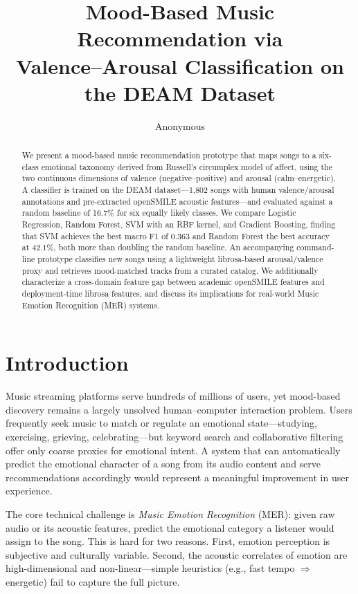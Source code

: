 \documentclass{article}
\title{Mood-Based Music Recommendation via\\
Valence--Arousal Classification on the DEAM Dataset}
\author{Anonymous}
\begin{document}
\lhead{}

\maketitle

%
\begin{abstract}
%
We present a mood-based music recommendation prototype that maps songs to a
six-class emotional taxonomy derived from Russell's circumplex model of affect,
using the two continuous dimensions of valence (negative--positive) and arousal
(calm--energetic).
A classifier is trained on the DEAM dataset---1{,}802 songs with human
valence/arousal annotations and pre-extracted openSMILE acoustic
features---and evaluated against a random baseline of 16.7\% for six equally
likely classes.
We compare Logistic Regression, Random Forest, SVM with an RBF kernel, and
Gradient Boosting, finding that SVM achieves the best macro F1 of 0.363
and Random Forest the best accuracy at 42.1\%, both more than doubling the
random baseline.
An accompanying command-line prototype classifies new songs using a
lightweight librosa-based arousal/valence proxy and retrieves mood-matched
tracks from a curated catalog.
We additionally characterize a cross-domain feature gap between academic
openSMILE features and deployment-time librosa features, and discuss its
implications for real-world Music Emotion Recognition (MER) systems.
\end{abstract}

%
\section{Introduction}
%

Music streaming platforms serve hundreds of millions of users, yet mood-based
discovery remains a largely unsolved human--computer interaction problem.
Users frequently seek music to match or regulate an emotional state---studying,
exercising, grieving, celebrating---but keyword search and collaborative
filtering offer only coarse proxies for emotional intent.
A system that can automatically predict the emotional character of a song
from its audio content and serve recommendations accordingly would represent
a meaningful improvement in user experience.

The core technical challenge is \emph{Music Emotion Recognition} (MER): given
raw audio or its acoustic features, predict the emotional category a listener
would assign to the song.
This is hard for two reasons.
First, emotion perception is subjective and culturally variable.
Second, the acoustic correlates of emotion are high-dimensional and
non-linear---simple heuristics (e.g., fast tempo $\Rightarrow$ energetic) fail
to capture the full picture.
\end{document}
